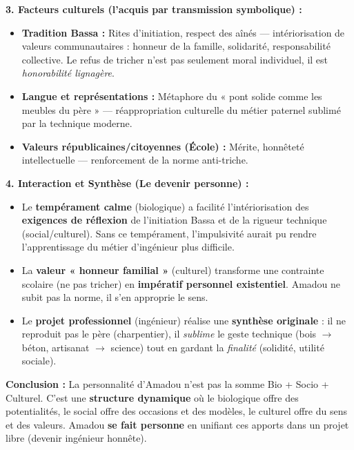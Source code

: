 \documentclass[11pt]{article}
\newcommand{\cle}[1]{{\popxbold\color{popdark}#1}}
\begin{document}
\begin{exoresolu}
\textbf{3. Facteurs culturels (l'acquis par transmission symbolique) :}
\begin{itemize}
    \item \textbf{Tradition Bassa :} Rites d'initiation, respect des aînés — intériorisation de valeurs \cle{communautaires} : honneur de la famille, solidarité, responsabilité collective. Le refus de tricher n'est pas seulement moral individuel, il est \emph{honorabilité lignagère}.
    \item \textbf{Langue et représentations :} Métaphore du « pont solide comme les meubles du père » — réappropriation culturelle du métier paternel sublimé par la technique moderne.
    \item \textbf{Valeurs républicaines/citoyennes (École) :} Mérite, honnêteté intellectuelle — renforcement de la norme anti-triche.
\end{itemize}

\textbf{4. Interaction et Synthèse (Le devenir personne) :}
\begin{itemize}
    \item Le \textbf{tempérament calme} (biologique) a facilité l'intériorisation des \textbf{exigences de réflexion} de l'initiation Bassa et de la rigueur technique (social/culturel). Sans ce tempérament, l'impulsivité aurait pu rendre l'apprentissage du métier d'ingénieur plus difficile.
    \item La \textbf{valeur « honneur familial »} (culturel) transforme une contrainte scolaire (ne pas tricher) en \textbf{impératif personnel existentiel}. Amadou ne subit pas la norme, il s'en \cle{approprie} le sens.
    \item Le \textbf{projet professionnel} (ingénieur) réalise une \textbf{synthèse originale} : il ne reproduit pas le père (charpentier), il \emph{sublime} le geste technique (bois $\to$ béton, artisanat $\to$ science) tout en gardant la \emph{finalité} (solidité, utilité sociale).
\end{itemize}
\textbf{Conclusion :} La personnalité d'Amadou n'est pas la somme Bio + Socio + Culturel. C'est une \textbf{structure dynamique} où le biologique offre des potentialités, le social offre des occasions et des modèles, le culturel offre du sens et des valeurs. Amadou \textbf{se fait personne} en unifiant ces apports dans un projet libre (devenir ingénieur honnête).
\end{exoresolu}
\end{document}
